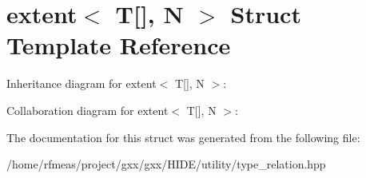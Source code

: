 \hypertarget{structextent_3_01T[]_00_01N_01_4}{}\section{extent$<$ T\mbox{[}\mbox{]}, N $>$ Struct Template Reference}
\label{structextent_3_01T[]_00_01N_01_4}


Inheritance diagram for extent$<$ T\mbox{[}\mbox{]}, N $>$\+:


Collaboration diagram for extent$<$ T\mbox{[}\mbox{]}, N $>$\+:


The documentation for this struct was generated from the following file\+:\begin{DoxyCompactItemize}
\item 
/home/rfmeas/project/gxx/gxx/\+H\+I\+D\+E/utility/type\+\_\+relation.\+hpp\end{DoxyCompactItemize}
